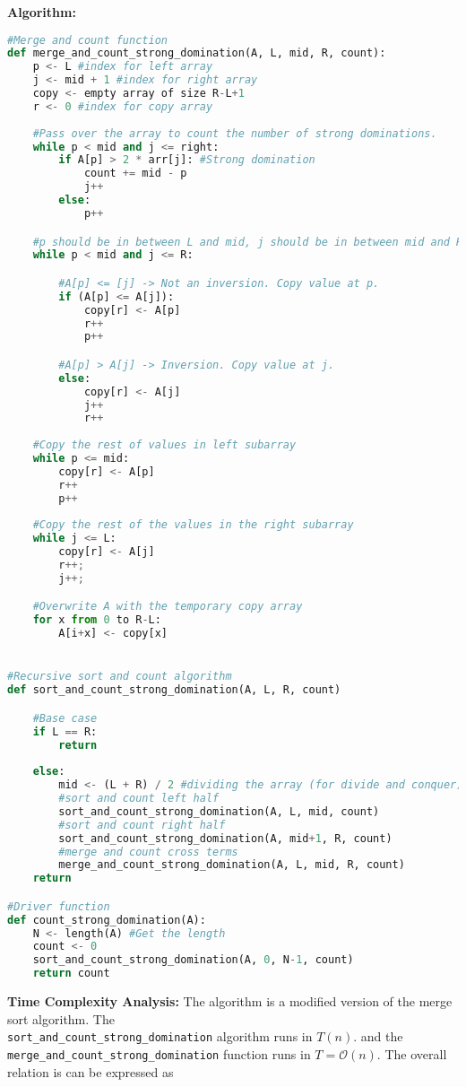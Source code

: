 \documentclass[10pt, a4paper]{article}
\newcommand{\BigO}{\mathcal{O}}
\begin{document}
\textbf{Algorithm:}
\begin{lstlisting}[language=Python,caption= Count strongly dominant]
    #Merge and count function
def merge_and_count_strong_domination(A, L, mid, R, count):
    p <- L #index for left array
    j <- mid + 1 #index for right array
    copy <- empty array of size R-L+1
    r <- 0 #index for copy array
    
    #Pass over the array to count the number of strong dominations.
    while p < mid and j <= right: 
        if A[p] > 2 * arr[j]: #Strong domination
            count += mid - p
            j++
        else: 
            p++

    #p should be in between L and mid, j should be in between mid and R.
    while p < mid and j <= R:

        #A[p] <= [j] -> Not an inversion. Copy value at p.
        if (A[p] <= A[j]): 
            copy[r] <- A[p]
            r++
            p++

        #A[p] > A[j] -> Inversion. Copy value at j.
        else:
            copy[r] <- A[j]
            j++
            r++
    
    #Copy the rest of values in left subarray
    while p <= mid: 
        copy[r] <- A[p]
        r++
        p++
    
    #Copy the rest of the values in the right subarray
    while j <= L: 
        copy[r] <- A[j]
        r++;
        j++;

    #Overwrite A with the temporary copy array
    for x from 0 to R-L:
        A[i+x] <- copy[x]


#Recursive sort and count algorithm
def sort_and_count_strong_domination(A, L, R, count)

    #Base case
    if L == R:
        return
    
    else:
        mid <- (L + R) / 2 #dividing the array (for divide and conquer)
        #sort and count left half
        sort_and_count_strong_domination(A, L, mid, count)
        #sort and count right half
        sort_and_count_strong_domination(A, mid+1, R, count)
        #merge and count cross terms
        merge_and_count_strong_domination(A, L, mid, R, count)
    return

#Driver function
def count_strong_domination(A):
    N <- length(A) #Get the length
    count <- 0
    sort_and_count_strong_domination(A, 0, N-1, count)
    return count
\end{lstlisting}

\textbf{Time Complexity Analysis:}
The algorithm is a modified version of the merge sort algorithm. The \\\lstinline{sort_and_count_strong_domination} algorithm runs in $T(n)$. and the \lstinline{merge_and_count_strong_domination} function runs in $T = \BigO(n)$. The overall relation is can be expressed as
\end{document}

